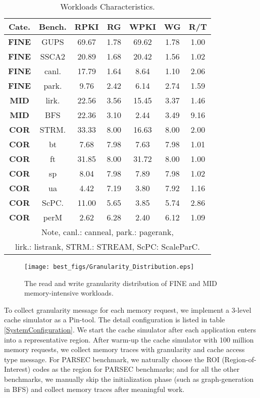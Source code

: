 \documentclass[pageno]{jpaper}
\begin{document}
\begin{table}[h!]
  \centering
  \begin{tabular}{|c|c|c|c|c|c|c|}
    \hline
    \textbf{Cate.} & \textbf{Bench.} & \textbf{RPKI} & \textbf{RG} & \textbf{WPKI} & \textbf{WG} & \textbf{R/T} \\
    \hline
    \textbf{FINE} & GUPS & 69.67 & 1.78 & 69.62 & 1.78 & 1.00 \\
    \textbf{FINE} & SSCA2 & 20.89 & 1.68 & 20.42 & 1.56 & 1.02 \\
    \textbf{FINE} & canl. & 17.79 & 1.64 & 8.64 & 1.10 & 2.06 \\
    \textbf{FINE} & park. & 9.76 & 2.42 & 6.14 & 2.74 & 1.59 \\
    \hline
    \textbf{MID} & lirk. & 22.56 & 3.56 & 15.45 & 3.37 & 1.46 \\
    \textbf{MID} & BFS & 22.36 & 3.10 & 2.44 & 3.49 & 9.16 \\
    \hline
    \textbf{COR} & STRM. & 33.33 & 8.00 & 16.63 & 8.00 & 2.00 \\
    \textbf{COR} & bt & 7.68 & 7.98 & 7.63 & 7.98 & 1.01 \\
    \textbf{COR} & ft & 31.85 & 8.00 & 31.72 & 8.00 & 1.00 \\
    \textbf{COR} & sp & 8.04 & 7.98 & 7.89 & 7.98 & 1.02 \\
    \textbf{COR} & ua & 4.42 & 7.19 & 3.80 & 7.92 & 1.16 \\
    \textbf{COR} & ScPC. & 11.00 & 5.65 & 3.85 & 5.74 & 2.86 \\
    \textbf{COR} & perM & 2.62 & 6.28 & 2.40 & 6.12 & 1.09 \\
    \hline
    \hline
    \multicolumn{7}{|c|}{Note, canl.: canneal, park.: pagerank,} \\
    \multicolumn{7}{|c|}{lirk.: listrank, STRM.: STREAM, ScPC: ScaleParC.} \\
    \hline
  \end{tabular}
  \caption{Workloads Characteristics.}
  \label{Workloads}
\end{table}

\begin{figure}
  \centering
  \texttt{[image: best\_figs/Granularity\_Distribution.eps]}
  \caption{The read and write granularity distribution of FINE and MID memory-intensive workloads.}
  \label{GranularityDistribution}
\end{figure}

To collect granularity message for each memory request, we implement a 3-level cache simulator as a Pin-tool. The detail configuration is listed in table \ref{SystemConfiguration}. We start the cache simulator after each application enters into a representative region. After warm-up the cache simulator with 100 million memory requests, we collect memory traces with granularity and cache access type message. For PARSEC benchmark, we naturally choose the ROI (Region-of-Interest) codes as the region for PARSEC benchmarks; and for all the other benchmarks, we manually skip the initialization phase (such as graph-generation in BFS) and collect memory traces after meaningful work.
\end{document}
